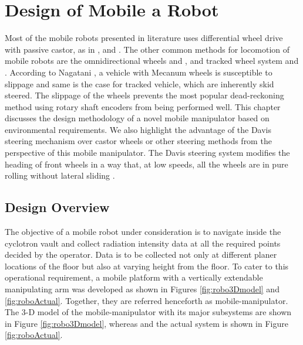 \chapter{Design of Mobile a Robot}
\label{ch_3:KPI}

Most of the mobile robots presented in literature uses differential wheel drive  with passive castor, as in \cite{yamamoto1992coordinating}, \cite{rajendran2004} and \cite{saha1989kinematics}. The other  common methods for locomotion of mobile robots are the omnidirectional wheels  \cite{pin1994new} and \cite{salih2006designing}, and tracked wheel system \cite{suthakorn2009design} and \cite{guarnieri2004development}. According  to  Nagatani \cite{nagatani2000improvement},  a  vehicle  with  Mecanum  wheels  is  susceptible  to slippage and same is the case for tracked vehicle, which are inherently skid steered. The slippage of the wheels prevents the most popular dead-reckoning method using rotary shaft  encoders   from  being  performed  well. This chapter   discusses the  design methodology of a novel mobile manipulator based on environmental requirements. We also  highlight the advantage of the Davis steering mechanism over castor wheels  or other steering methods from the perspective of this mobile manipulator.   The Davis steering system modifies the heading of  front wheels in a way that, at low speeds, all the wheels are in pure rolling without lateral sliding \cite{wong2008theory}.  


\section{Design Overview}
 The objective of a  mobile robot under consideration is to navigate inside the cyclotron vault and collect radiation intensity data at all the required points decided by the operator. Data is to be collected not only at different planer locations of the floor but also at varying height from the floor. To cater to this operational requirement, a mobile platform with a vertically extendable manipulating arm was developed as shown in  Figures \ref{fig:robo3Dmodel} and \ref{fig:roboActual}. Together, they are   referred henceforth as mobile-manipulator. The 3-D model of the mobile-manipulator with its major subsystems are shown in Figure \ref{fig:robo3Dmodel}, whereas  and the actual   system  is shown in Figure  \ref{fig:roboActual}. 

